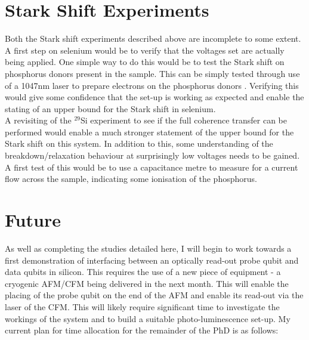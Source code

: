 \section{Stark Shift Experiments}

Both the Stark shift experiments described above are incomplete to some extent. 
A first step on selenium would be to verify that the voltages set are actually being applied.
One simple way to do this would be to test the Stark shift on phosphorus donors present in the sample.
This can be simply tested through use of a 1047nm laser to prepare electrons on the phosphorus donors \cite{Nardo2015}.
Verifying this would give some confidence that the set-up is working as expected and enable the stating of an upper bound for the Stark shift in selenium.
\\
A revisiting of the $^{29}$Si experiment to see if the full coherence transfer can be performed would enable a much stronger statement of the upper bound for the Stark shift on this system.
In addition to this, some understanding of the breakdown/relaxation behaviour at surprisingly low voltages needs to be gained.
A first test of this would be to use a capacitance metre to measure for a current flow across the sample, indicating some ionisation of the phosphorus. 

\section{Future}

As well as completing the studies detailed here, I will begin to work towards a first demonstration of interfacing between an optically read-out probe qubit and data qubits in silicon.
This requires the use of a new piece of equipment - a cryogenic AFM/CFM being delivered in the next month.
This will enable the placing of the probe qubit on the end of the AFM and enable its read-out via the laser of the CFM.
This will likely require significant time to investigate the workings of the system and to build a suitable photo-luminescence set-up.
My current plan for time allocation for the remainder of the PhD is as follows:


